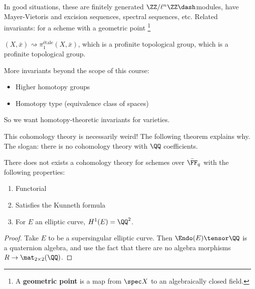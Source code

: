 In good situations, these are finitely generated
\(\ZZ/\ell^n\ZZ\dash\)modules, have Mayer-Vietoris and excision
sequences, spectral sequences, etc. Related invariants: for a scheme
with a geometric point \footnote{A \textbf{geometric point} is a map
  from \(\spec X\) to an algebraically closed field.}

\((X, \bar x) \rightsquigarrow \pi_1^{\text{étale}}(X, \bar x)\), which
is a profinite topological group, which is a profinite topological
group.

\begin{remark}

More invariants beyond the scope of this course:

\begin{itemize}
\tightlist
\item
  Higher homotopy groups
\item
  Homotopy type (equivalence class of spaces)
\end{itemize}

So we want homotopy-theoretic invariants for varieties.

\end{remark}

\begin{remark}

This cohomology theory is necessarily weird! The following theorem
explains why. The slogan: there is no cohomology theory with \(\QQ\)
coefficients.

\end{remark}

\begin{theorem}[Serre]

There does not exists a cohomology theory for schemes over
\(\bar{\FF}_q\) with the following properties:

\begin{enumerate}
\def\labelenumi{\arabic{enumi}.}
\tightlist
\item
  Functorial
\item
  Satisfies the Kunneth formula
\item
  For \(E\) an elliptic curve, \(H^1(E) = \QQ^2\).
\end{enumerate}

\end{theorem}

\begin{proof}

Take \(E\) to be a supersingular elliptic curve. Then
\(\Endo(E) \tensor \QQ\) is a quaternion algebra, and use the fact that
there are no algebra morphisms \(R\to \mat_{2\times 2}(\QQ)\).

\end{proof}

